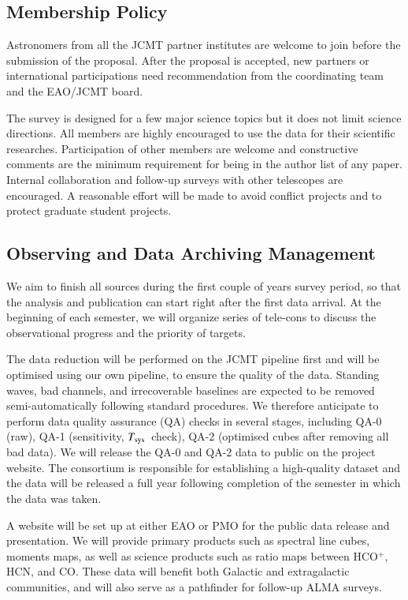 \documentclass[legal,11pt]{article}
\def\Tsys {$T_{\rm sys}$}
\def\HCOP       {HCO$^{+}$}
\begin{document}
\subsection{Membership Policy}

Astronomers from all the JCMT partner institutes are welcome to join before the
submission of the proposal. After the proposal is accepted, new partners or
international participations need  recommendation from the coordinating team
and the EAO/JCMT board. 

The survey is designed for a few major science topics but it does not limit
science directions. All members are highly encouraged to use the data for their
scientific researches. Participation of other members are welcome and
constructive comments are the minimum requirement for being in the author list
of any paper. Internal collaboration and follow-up surveys with other
telescopes are encouraged. A reasonable effort will be made to avoid conflict
projects and to protect graduate student projects.


\subsection{Observing and  Data Archiving Management}

We aim to finish all sources during the first couple of years survey period, so that
the analysis and publication can start right after the first data arrival. At
the beginning of each semester, we will organize series of tele-cons to discuss the
observational progress and the priority of targets. 

The data reduction will be performed on the JCMT pipeline first and will be
optimised using our own pipeline, to ensure the quality of the data. Standing
waves, bad channels, and irrecoverable baselines are expected to be removed
semi-automatically following standard procedures. We therefore anticipate to
perform data quality assurance (QA) checks in several stages, including QA-0
(raw), QA-1 (sensitivity, \Tsys\ check), QA-2 (optimised cubes after removing
all bad data). We will release the QA-0 and QA-2 data to public on the project
website. The consortium is responsible for establishing a high-quality dataset
and the data will be released a full year following completion of the semester
in which the data was taken.

A website will be set up at either EAO or PMO for the public data release and
presentation. We will provide primary products such as spectral line cubes,
moments maps, as well as science products such as ratio maps between \HCOP,
HCN, and CO. These data will benefit both Galactic and extragalactic
communities, and will also serve as a pathfinder for follow-up ALMA surveys.
\end{document}
